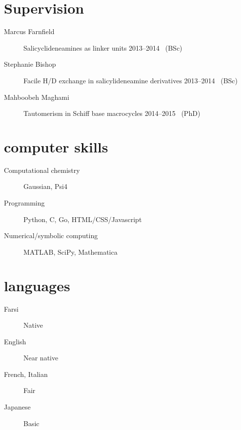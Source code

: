 \documentclass[overlapped,line,10pt,letterpaper]{res}
\begin{document}
\begin{resume}
\section{Supervision}
\begin{description}
\item[Marcus Farnfield]  Salicyclideneamines as linker units \hspace{\fill} 2013–2014 \, (BSc)
\item[Stephanie Bishop] Facile H/D exchange in salicylideneamine derivatives \hspace{\fill} 2013–2014 \, (BSc)
\item[Mahboobeh Maghami] Tautomerism in Schiff base macrocycles \hspace{\fill} 2014–2015 \, (PhD)
\end{description}

\section{computer skills}
\begin{description}
\item[Computational chemistry] Gaussian, Psi4
\item[Programming] Python, C, Go, HTML/CSS/Javascript
\item[Numerical/symbolic computing] MATLAB, SciPy, Mathematica
\end{description}

\section{languages}
\begin{description}
\item[Farsi] Native
\item[English] Near native
\item[French, Italian] Fair
\item[Japanese] Basic
\end{description}
\end{resume}
\end{document}
